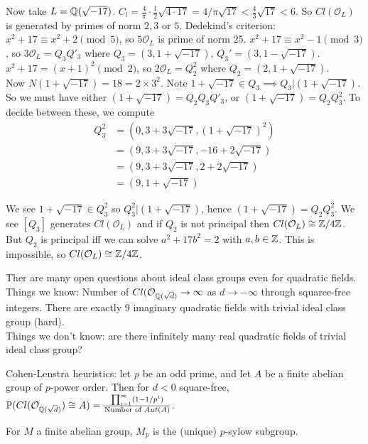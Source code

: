 \documentclass[a4paper]{article}
\begin{document}
Now take $L = \mathbb{Q}(\sqrt{-17})$. $C_l = \frac{4}{\pi}\cdot \frac{1}{2} \sqrt{4\cdot 17} = 4/\pi \sqrt{17} < \frac{4}{3} \sqrt{17} < 6$. So $Cl(\mathcal{O}_L)$ is generated by primes of norm $2,3$ or $5$. Dedekind's criterion: $x^2 + 17 \equiv x^2 + 2 \pmod 5$, so $5 \mathcal{O}_L$ is prime of norm 25. $x^2+17 \equiv x^2-1 \pmod 3$, so $3 \mathcal{O}_L = Q_3 Q'_3$ where $Q_3 = (3,1+\sqrt{-17})$, $Q_3' = (3,1-\sqrt{-17})$. $x^2+17 = (x+1)^2 \pmod 2$, so $2 \mathcal{O}_L = Q_2^2$ where $Q_2 = (2,1+\sqrt{-17})$.\\
Now $N(1+\sqrt{-17}) = 18 = 2 \times 3^2$. Note $1+\sqrt{-17} \in Q_3 \implies Q_3 | (1+\sqrt{-17})$. So we must have either $(1+\sqrt{-17}) = Q_2Q_3Q'_3$, or $(1+\sqrt{-17}) = Q_2 Q_3^2$. To decide between these, we compute
\begin{equation*}
\begin{aligned}
Q_3^2 &= (0,3+3\sqrt{-17},(1+\sqrt{-17})^2)\\
&= (9,3+3\sqrt{-17},-16+2\sqrt{-17})\\
&= (9,3+3\sqrt{-17},2+2\sqrt{-17})\\
&= (9,1+\sqrt{-17})
\end{aligned}
\end{equation*}

We see $1+\sqrt{-17} \in Q_3^2$ so $Q_3^2 | (1+\sqrt{-17})$, hence $(1+\sqrt{-17}) = Q_2Q_3^2$. We see $[Q_3]$ generates $Cl(\mathcal{O}_L)$ and if $Q_2$ is not principal then $Cl(\mathcal{O}_L) \cong \mathbb{Z}/4\mathbb{Z}$. But $Q_2$ is principal iff we can solve $a^2+17b^2 = 2$ with $a,b \in \mathbb{Z}$. This is impossible, so $Cl(\mathcal{O}_L) \cong \mathbb{Z}/4\mathbb{Z}$.

\begin{rem}
Ther are many open questions about ideal class groups even for quadratic fields.\\
Things we know: Number of $Cl(\mathcal{O}_{\mathbb{Q}(\sqrt{d})} \to \infty$ as $d \to -\infty$ through squaree-free integers. There are exactly 9 imaginary quadratic fields with trivial ideal class group (hard).\\
Things we don't know: are there infinitely many real quadratic fields of trivial ideal class group?
\end{rem}

Cohen-Lenstra heuristics: let $p$ be an odd prime, and let $A$ be a finite abelian group of $p$-power order. Then for $d<0$ square-free, $\mathbb{P}(Cl(\mathcal{O}_{\mathbb{Q}(\sqrt{d})}) \cong A) = \frac{\prod_{i=1}^\infty (1-1/p^i)}{\text{Number of }Aut(A)}$.

For $M$ a finite abelian group, $M_p$ is the (unique) $p$-sylow subgroup.
\end{document}
